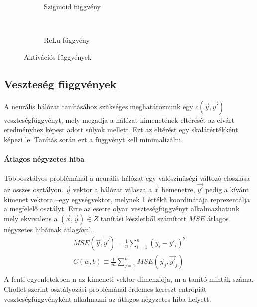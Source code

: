 \begin{figure}[h]
	\centering
	\begin{subfigure}[b]{0.3\textwidth}
		\def\svgwidth{0.5\columnwidth}
		
		\caption{Szigmoid függvény}
		\label{fig:sigmoid}
	\end{subfigure}
	~
	\begin{subfigure}[b]{0.3\textwidth}
		\def\svgwidth{0.5\columnwidth}
		
		\caption{ReLu függvény}
	\end{subfigure}
	\caption{Aktivációs függvények }
\end{figure}

\subsection{Veszteség függvények}
A neurális hálózat tanításához szükséges meghatároznunk egy $c(\vec{y},\vec{y'})$ veszteségfüggvényt, mely megadja a hálózat kimenetének eltérését az elvárt eredményhez képest adott súlyok mellett. Ezt az eltérést egy skalárértékként képezi le. Tanítás során ezt a függvényt kell minimalizálni.

\paragraph[MSE]{Átlagos négyzetes hiba}\label{par:mse}
Többosztályos problémánál a neurális hálózat egy valószínűségi változó eloszlása az összes osztályon. $\vec{y}$ vektor a hálózat válasza a $\vec{x}$ bemenetre, $\vec{y'}$ pedig a kívánt kimenet vektora --egy egységvektor, melynek 1 értékű koordinátája reprezentálja a megfelelő osztályt. Erre az esetre olyan veszteségfüggvényt alkalmazhatunk mely ekvivalens a $(\vec{x},\vec{y})\in Z$ tanítási készletből számított $MSE$ átlagos négyzetes hibáinak átlagával.
\begin{align*}
	MSE(\vec{y},\vec{y'}) = \frac{1}{n}\sum_{i=1}^{n} (y_i - y'_i)^2\\
	C(w,b) \equiv \frac{1}{m}\sum_{j=1}^{m} MSE(\vec{y}_j,\vec{y'}_j)\\
\end{align*}
A fenti egyenletekben n az kimeneti vektor dimenziója, m a tanító minták száma.
Chollet szerint osztályozási problémánál érdemes kereszt-entrópiát veszteségfüggvényként alkalmazni az átlagos négyzetes hiba helyett.\cite{chollet}

